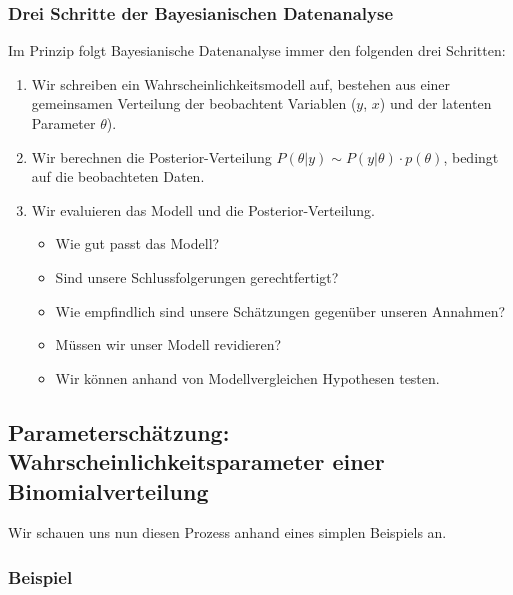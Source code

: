 \documentclass[]{tufte-handout}
\providecommand{\tightlist}{%
  \setlength{\itemsep}{0pt}\setlength{\parskip}{0pt}}
\begin{document}
\hypertarget{drei-schritte-der-bayesianischen-datenanalyse}{%
\subsubsection{Drei Schritte der Bayesianischen
Datenanalyse}\label{drei-schritte-der-bayesianischen-datenanalyse}}

Im Prinzip folgt Bayesianische Datenanalyse immer den folgenden drei
Schritten:

\begin{enumerate}
\def\labelenumi{\arabic{enumi}.}
\item
  Wir schreiben ein Wahrscheinlichkeitsmodell auf, bestehen aus einer
  gemeinsamen Verteilung der beobachtent Variablen (\(y\), \(x\)) und
  der latenten Parameter \(\theta\)).
\item
  Wir berechnen die Posterior-Verteilung
  \(P(θ | y) \sim P(y | \theta) \cdot p(\theta)\), bedingt auf die
  beobachteten Daten.
\item
  Wir evaluieren das Modell und die Posterior-Verteilung.

  \begin{itemize}
  \tightlist
  \item
    Wie gut passt das Modell?
  \item
    Sind unsere Schlussfolgerungen gerechtfertigt?
  \item
    Wie empfindlich sind unsere Schätzungen gegenüber unseren Annahmen?
  \item
    Müssen wir unser Modell revidieren?
  \item
    Wir können anhand von Modellvergleichen Hypothesen testen.
  \end{itemize}
\end{enumerate}

\hypertarget{parameterschuxe4tzung-wahrscheinlichkeitsparameter-einer-binomialverteilung}{%
\subsection{Parameterschätzung: Wahrscheinlichkeitsparameter einer
Binomialverteilung}\label{parameterschuxe4tzung-wahrscheinlichkeitsparameter-einer-binomialverteilung}}

Wir schauen uns nun diesen Prozess anhand eines simplen Beispiels an.

\hypertarget{beispiel}{%
\subsubsection{Beispiel}\label{beispiel}}
\end{document}
